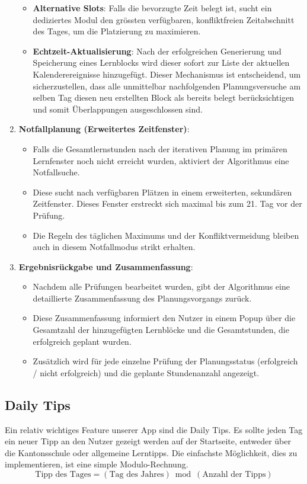 \documentclass[12pt,a4paper]{report}
\begin{document}
\begin{enumerate}
\begin{itemize}
        \item \textbf{Alternative Slots}: Falls die bevorzugte Zeit belegt ist, sucht ein dediziertes Modul den grössten verfügbaren, konfliktfreien Zeitabschnitt des Tages, um die Platzierung zu maximieren.
        \item \textbf{Echtzeit-Aktualisierung}: Nach der erfolgreichen Generierung und Speicherung eines Lernblocks wird dieser sofort zur Liste der aktuellen Kalenderereignisse hinzugefügt. Dieser Mechanismus ist entscheidend, um sicherzustellen, dass alle unmittelbar nachfolgenden Planungsversuche am selben Tag diesen neu erstellten Block als bereits belegt berücksichtigen und somit Überlappungen ausgeschlossen sind.
    \end{itemize}
    \item \textbf{Notfallplanung (Erweitertes Zeitfenster)}:
    \begin{itemize}
        \item Falls die Gesamtlernstunden nach der iterativen Planung im primären Lernfenster noch nicht erreicht wurden, aktiviert der Algorithmus eine Notfallsuche.
        \item Diese sucht nach verfügbaren Plätzen in einem erweiterten, sekundären Zeitfenster. Dieses Fenster erstreckt sich maximal bis zum 21. Tag vor der Prüfung.
        \item Die Regeln des täglichen Maximums und der Konfliktvermeidung bleiben auch in diesem Notfallmodus strikt erhalten.
    \end{itemize}
    \item \textbf{Ergebnisrückgabe und Zusammenfassung}:
    \begin{itemize}
        \item Nachdem alle Prüfungen bearbeitet wurden, gibt der Algorithmus eine detaillierte Zusammenfassung des Planungsvorgangs zurück.
        \item Diese Zusammenfassung informiert den Nutzer in einem Popup über die Gesamtzahl der hinzugefügten Lernblöcke und die Gesamtstunden, die erfolgreich geplant wurden.
        \item Zusätzlich wird für jede einzelne Prüfung der Planungsstatus (erfolgreich / nicht erfolgreich) und die geplante Stundenanzahl angezeigt.
    \end{itemize}
\end{enumerate}


\subsection{Daily Tips}
Ein relativ wichtiges Feature unserer App sind die Daily Tips. Es sollte jeden Tag ein neuer Tipp an den Nutzer gezeigt werden auf der Startseite, entweder über die Kantonsschule oder allgemeine Lerntipps. Die einfachste Möglichkeit, dies zu implementieren, ist eine simple Modulo-Rechnung. 
\[
\text{Tipp des Tages} = (\text{Tag des Jahres}) \bmod (\text{Anzahl der Tipps})
\]
\end{document}
